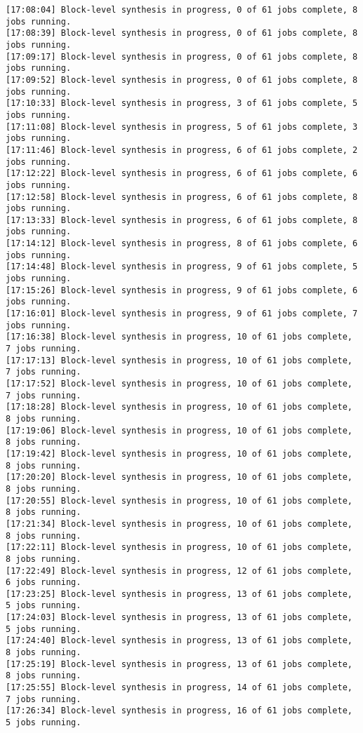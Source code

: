 \begin{lstlisting}[label=some-code-2,caption=Содержимое файла v++\_vinc.log]
[17:08:04] Block-level synthesis in progress, 0 of 61 jobs complete, 8 jobs running.
[17:08:39] Block-level synthesis in progress, 0 of 61 jobs complete, 8 jobs running.
[17:09:17] Block-level synthesis in progress, 0 of 61 jobs complete, 8 jobs running.
[17:09:52] Block-level synthesis in progress, 0 of 61 jobs complete, 8 jobs running.
[17:10:33] Block-level synthesis in progress, 3 of 61 jobs complete, 5 jobs running.
[17:11:08] Block-level synthesis in progress, 5 of 61 jobs complete, 3 jobs running.
[17:11:46] Block-level synthesis in progress, 6 of 61 jobs complete, 2 jobs running.
[17:12:22] Block-level synthesis in progress, 6 of 61 jobs complete, 6 jobs running.
[17:12:58] Block-level synthesis in progress, 6 of 61 jobs complete, 8 jobs running.
[17:13:33] Block-level synthesis in progress, 6 of 61 jobs complete, 8 jobs running.
[17:14:12] Block-level synthesis in progress, 8 of 61 jobs complete, 6 jobs running.
[17:14:48] Block-level synthesis in progress, 9 of 61 jobs complete, 5 jobs running.
[17:15:26] Block-level synthesis in progress, 9 of 61 jobs complete, 6 jobs running.
[17:16:01] Block-level synthesis in progress, 9 of 61 jobs complete, 7 jobs running.
[17:16:38] Block-level synthesis in progress, 10 of 61 jobs complete, 7 jobs running.
[17:17:13] Block-level synthesis in progress, 10 of 61 jobs complete, 7 jobs running.
[17:17:52] Block-level synthesis in progress, 10 of 61 jobs complete, 7 jobs running.
[17:18:28] Block-level synthesis in progress, 10 of 61 jobs complete, 8 jobs running.
[17:19:06] Block-level synthesis in progress, 10 of 61 jobs complete, 8 jobs running.
[17:19:42] Block-level synthesis in progress, 10 of 61 jobs complete, 8 jobs running.
[17:20:20] Block-level synthesis in progress, 10 of 61 jobs complete, 8 jobs running.
[17:20:55] Block-level synthesis in progress, 10 of 61 jobs complete, 8 jobs running.
[17:21:34] Block-level synthesis in progress, 10 of 61 jobs complete, 8 jobs running.
[17:22:11] Block-level synthesis in progress, 10 of 61 jobs complete, 8 jobs running.
[17:22:49] Block-level synthesis in progress, 12 of 61 jobs complete, 6 jobs running.
[17:23:25] Block-level synthesis in progress, 13 of 61 jobs complete, 5 jobs running.
[17:24:03] Block-level synthesis in progress, 13 of 61 jobs complete, 5 jobs running.
[17:24:40] Block-level synthesis in progress, 13 of 61 jobs complete, 8 jobs running.
[17:25:19] Block-level synthesis in progress, 13 of 61 jobs complete, 8 jobs running.
[17:25:55] Block-level synthesis in progress, 14 of 61 jobs complete, 7 jobs running.
[17:26:34] Block-level synthesis in progress, 16 of 61 jobs complete, 5 jobs running.

\end{lstlisting}
